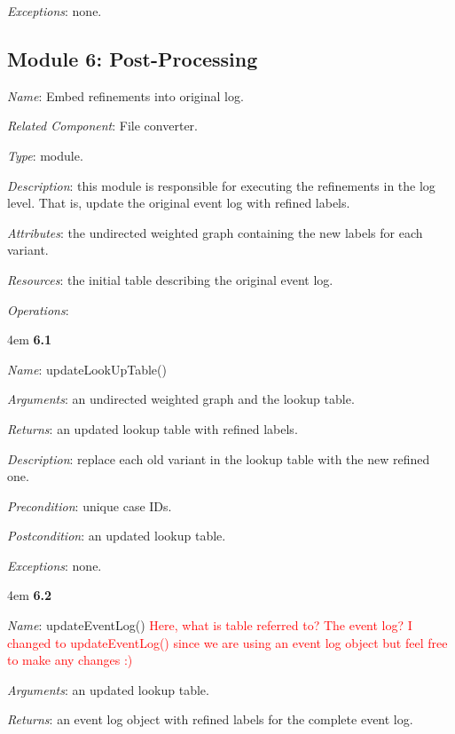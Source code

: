 \documentclass[notitlepage]{article}
\begin{document}
\begin{flushleft}
\textit{Exceptions}: none.
\par
\endgroup




\subsection{Module 6: Post-Processing}
\textit{Name}: Embed refinements into original log.

\textit{Related Component}: File converter.

\textit{Type}: module.

\textit{Description}: this module is responsible for executing the refinements in the log level. That is, update the original event log with refined labels.

\textit{Attributes}: the undirected weighted graph containing the new labels for each variant.

\textit{Resources}: the initial table describing the original event log.

\textit{Operations}: 
\medskip

\par
\begingroup
\leftskip4em
\textbf{6.1} 

\textit{Name}: updateLookUpTable()

\textit{Arguments}: an undirected weighted graph and the lookup table.

\textit{Returns}: an updated lookup table with refined labels.

\textit{Description}: replace each old variant in the lookup table with the new refined one.

\textit{Precondition}: unique case IDs.

\textit{Postcondition}: an updated lookup table.

\textit{Exceptions}: none.
\par
\endgroup


\medskip

\par
\begingroup
\leftskip4em
\textbf{6.2} 

\textit{Name}: updateEventLog() \textcolor{red}{Here, what is table referred to? The event log? I changed to updateEventLog() since we are using an event log object but feel free to make any changes :)}

\textit{Arguments}: an updated lookup table.

\textit{Returns}: an event log object with refined labels for the complete event log.


\end{flushleft}
\end{document}
